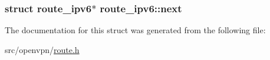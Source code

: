 \subsubsection[{next}]{\setlength{\rightskip}{0pt plus 5cm}struct {\bf route\+\_\+ipv6}$\ast$ route\+\_\+ipv6\+::next}\label{structroute__ipv6_a636a9acc728a4c83d04eee418979d775}


The documentation for this struct was generated from the following file\+:\begin{DoxyCompactItemize}
\item 
src/openvpn/\hyperlink{route_8h}{route.\+h}\end{DoxyCompactItemize}
